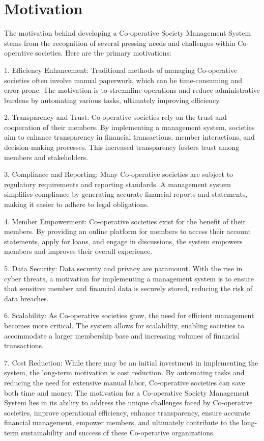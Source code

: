 \section{Motivation}
The motivation behind developing a Co-operative Society Management System stems from the recognition of several pressing needs and challenges within Co-operative
societies. Here are the primary motivations:

1. Efficiency Enhancement: Traditional methods of managing Co-operative societies
often involve manual paperwork, which can be time-consuming and error-prone. The
motivation is to streamline operations and reduce administrative burdens by automating
various tasks, ultimately improving efficiency.

2. Transparency and Trust: Co-operative societies rely on the trust and cooperation of
their members. By implementing a management system, societies aim to enhance
transparency in financial transactions, member interactions, and decision-making
processes. This increased transparency fosters trust among members and stakeholders.

3. Compliance and Reporting: Many Co-operative societies are subject to regulatory
requirements and reporting standards. A management system simplifies compliance by generating accurate financial reports and statements, making it easier to adhere to legal obligations.

4. Member Empowerment: Co-operative societies exist for the benefit of their
members. By providing an online platform for members to access their account
statements, apply for loans, and engage in discussions, the system empowers members
and improves their overall experience.

5. Data Security: Data security and privacy are paramount. With the rise in cyber threats, a motivation for implementing a management system is to ensure that sensitive member and financial data is securely stored, reducing the risk of data breaches.

6. Scalability: As Co-operative societies grow, the need for efficient management
becomes more critical. The system allows for scalability, enabling societies to
accommodate a larger membership base and increasing volumes of financial transactions.

7. Cost Reduction: While there may be an initial investment in implementing the system,
the long-term motivation is cost reduction. By automating tasks and reducing the need for extensive manual labor, Co-operative societies can save both time and money.
The motivation for a Co-operative Society Management System lies in its ability to
address the unique challenges faced by Co-operative societies, improve operational
efficiency, enhance transparency, ensure accurate financial management, empower
members, and ultimately contribute to the long-term sustainability and success of these
Co-operative organizations. 

